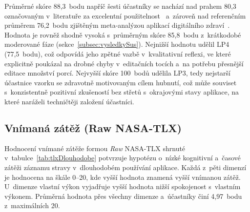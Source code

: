Průměrné skóre 88,3~bodu napříč šesti účastníky se nachází nad prahem 80,3 označovaným v~literatuře za excelentní použitelnost~\cite{bangor2008susAdjective} a~zároveň nad referenčním průměrem 76,2~bodu zjištěným meta-analýzou aplikací digitálního zdraví~\cite{hyzy2022susDigitalHealth}.
Hodnota je rovněž shodně vysoká s~průměrným skóre 85,8~bodu z~krátkodobé moderované fáze (sekce~\ref{subsec:vysledkySus}).
Nejnižší hodnotu udělil LP4 (77,5~bodu), což odpovídá jeho zpětné vazbě v~kvalitativní reflexi, ve které explicitně poukázal na drobné chyby v~editačních tocích a~na potřebu přesnější editace množství porcí.
Nejvyšší skóre 100~bodů udělila LP3, tedy nejstarší účastnice vzorku se zdravotně motivovaným cílem hubnutí, což může souviset s~konzistentně pozitivní zkušeností bez střetů s~okrajovými stavy aplikace, na které naráželi techničtěji založení účastníci.

\subsection{Vnímaná zátěž (Raw NASA-TLX)}
\label{subsec:tlxDlouhodobe}

Hodnocení vnímané zátěže formou \emph{Raw} NASA-TLX shrnuté v~tabulce~\ref{tab:tlxDlouhodobe} potvrzuje hypotézu o~nízké kognitivní a~časové zátěži záznamu stravy v~dlouhodobém používání aplikace.
Každá z~pěti dimenzí je hodnocena na škále 0--20, kde vyšší hodnota znamená vyšší vnímanou zátěž. U~dimenze vlastní výkon vyjadřuje vyšší hodnota nižší spokojenost s~vlastním výkonem.
Průměrná hodnota přes všechny dimenze a~účastníky činí 4,97~bodu z~maximálních 20.

